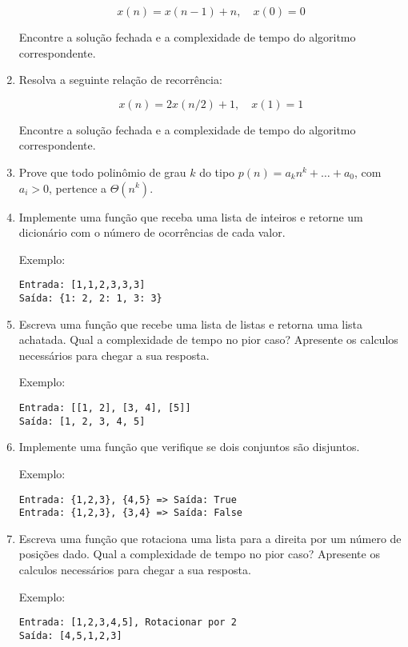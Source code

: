 \documentclass[12pt]{article}
\begin{document}
\begin{enumerate}
\[ x(n) = x(n-1) + n, \quad x(0) = 0 \]

Encontre a solução fechada e a complexidade de tempo do algoritmo correspondente.

\item Resolva a seguinte relação de recorrência:

\[ x(n) = 2x(n/2) + 1, \quad x(1) = 1 \]

Encontre a solução fechada e a complexidade de tempo do algoritmo correspondente.

\item Prove que todo polinômio de grau $k$ do tipo $p(n) = a_k n^k + \dots + a_0$, com $a_i > 0$, pertence a $\Theta(n^k)$.

\item Implemente uma função que receba uma lista de inteiros e retorne um dicionário com o número de ocorrências de cada valor.

Exemplo:
\begin{verbatim}
Entrada: [1,1,2,3,3,3]
Saída: {1: 2, 2: 1, 3: 3}
\end{verbatim}

\item Escreva uma função que recebe uma lista de listas e retorna uma lista achatada. Qual a complexidade de tempo no pior caso?  Apresente os calculos necessários para chegar a sua resposta.

Exemplo:
\begin{verbatim}
Entrada: [[1, 2], [3, 4], [5]]
Saída: [1, 2, 3, 4, 5]
\end{verbatim}

\item Implemente uma função que verifique se dois conjuntos são disjuntos.

Exemplo:
\begin{verbatim}
Entrada: {1,2,3}, {4,5} => Saída: True
Entrada: {1,2,3}, {3,4} => Saída: False
\end{verbatim}

\item Escreva uma função que rotaciona uma lista para a direita por um número de posições dado. Qual a complexidade de tempo no pior caso?  Apresente os calculos necessários para chegar a sua resposta.

Exemplo:
\begin{verbatim}
Entrada: [1,2,3,4,5], Rotacionar por 2
Saída: [4,5,1,2,3]
\end{verbatim}

\end{enumerate}
\end{document}

